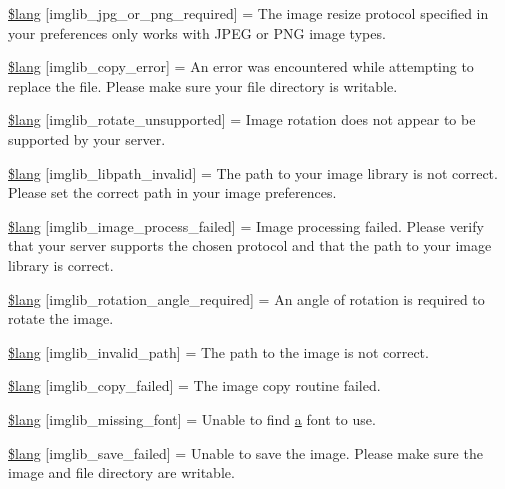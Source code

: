\begin{DoxyCompactItemize}
\hyperlink{imglib__lang_8php_a2878e2b878871cd8010970f865d70e71}{\$lang} \mbox{[}\textquotesingle{}imglib\+\_\+jpg\+\_\+or\+\_\+png\+\_\+required\textquotesingle{}\mbox{]} = \textquotesingle{}The image resize protocol specified in your preferences only works with J\+P\+E\+G or P\+N\+G image types.\textquotesingle{}
\item 
\hyperlink{imglib__lang_8php_a012b6a0d2b3a8ef934e8783d2fbd6535}{\$lang} \mbox{[}\textquotesingle{}imglib\+\_\+copy\+\_\+error\textquotesingle{}\mbox{]} = \textquotesingle{}An error was encountered while attempting to replace the file. Please make sure your file directory is writable.\textquotesingle{}
\item 
\hyperlink{imglib__lang_8php_ab1c77c6b58fc5bf8e979ab4237ec87e7}{\$lang} \mbox{[}\textquotesingle{}imglib\+\_\+rotate\+\_\+unsupported\textquotesingle{}\mbox{]} = \textquotesingle{}Image rotation does not appear to be supported by your server.\textquotesingle{}
\item 
\hyperlink{imglib__lang_8php_a8f190c17a02ca89334c8bf0a04333f65}{\$lang} \mbox{[}\textquotesingle{}imglib\+\_\+libpath\+\_\+invalid\textquotesingle{}\mbox{]} = \textquotesingle{}The path to your image library is not correct. Please set the correct path in your image preferences.\textquotesingle{}
\item 
\hyperlink{imglib__lang_8php_a9ac6659eb97dd12e5c714cc9635cf22e}{\$lang} \mbox{[}\textquotesingle{}imglib\+\_\+image\+\_\+process\+\_\+failed\textquotesingle{}\mbox{]} = \textquotesingle{}Image processing failed. Please verify that your server supports the chosen protocol and that the path to your image library is correct.\textquotesingle{}
\item 
\hyperlink{imglib__lang_8php_a1110d59ea8fd0564e78068dbda3438fb}{\$lang} \mbox{[}\textquotesingle{}imglib\+\_\+rotation\+\_\+angle\+\_\+required\textquotesingle{}\mbox{]} = \textquotesingle{}An angle of rotation is required to rotate the image.\textquotesingle{}
\item 
\hyperlink{imglib__lang_8php_a8ff486c25806a4731d1ffe20431df825}{\$lang} \mbox{[}\textquotesingle{}imglib\+\_\+invalid\+\_\+path\textquotesingle{}\mbox{]} = \textquotesingle{}The path to the image is not correct.\textquotesingle{}
\item 
\hyperlink{imglib__lang_8php_a9363000d2005b8276b39d581a11b562d}{\$lang} \mbox{[}\textquotesingle{}imglib\+\_\+copy\+\_\+failed\textquotesingle{}\mbox{]} = \textquotesingle{}The image copy routine failed.\textquotesingle{}
\item 
\hyperlink{imglib__lang_8php_a935800aad2be18ca4fe99bb074674848}{\$lang} \mbox{[}\textquotesingle{}imglib\+\_\+missing\+\_\+font\textquotesingle{}\mbox{]} = \textquotesingle{}Unable to find \hyperlink{assets_2js_2bootstrap_8min_8js_a1f5870dcf487187f13d5fd328ed9e6e7}{a} font to use.\textquotesingle{}
\item 
\hyperlink{imglib__lang_8php_a4d7a99fddc60c97a7327fa0125dea264}{\$lang} \mbox{[}\textquotesingle{}imglib\+\_\+save\+\_\+failed\textquotesingle{}\mbox{]} = \textquotesingle{}Unable to save the image. Please make sure the image and file directory are writable.\textquotesingle{}
\end{DoxyCompactItemize}


